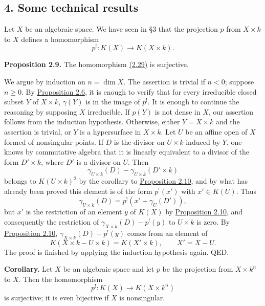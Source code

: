 \subsection*{4. Some technical results}

Let $X$ be an algebraic space. We have seen in \S 3 that the projection $p$ from $X\times k$ to $X$ defines a homomorphism
\begin{equation}\tag{2.29}
 p^!:K(X)\longrightarrow K(X\times k).
\end{equation}

\textbf{Proposition 2.9.} The homomorphism \hyperlink{sga6.e00.eq.2-29}{(2.29)} is surjective.

We argue by induction on $n=\dim X$. The assertion is trivial if $n<0$; suppose $n\geq 0$. By \hyperlink{sga6.e00.prop.2-6}{Proposition 2.6}, it is enough to verify that for every irreducible closed subset $Y$ of $X\times k$, $\gamma(Y)$ is in the image of $p^!$. It is enough to continue the reasoning by supposing $X$ irreducible. If $p(Y)$ is not dense in $X$, our assertion follows from the induction hypothesis. Otherwise, either $Y=X\times k$ and the assertion is trivial, or $Y$ is a hypersurface in $X\times k$. Let $U$ be an affine open of $X$ formed of nonsingular points. If $D$ is the divisor on $U\times k$ induced by $Y$, one knows by commutative algebra that it is linearly equivalent to a divisor of the form $D'\times k$, where $D'$ is a divisor on $U$. Then
\[
 \gamma_{U\times k}(D)-\gamma_{U\times k}(D'\times k)
\]
belongs to $K(U\times k)^2$ by the corollary to \hyperlink{sga6.e00.prop.2-10}{Proposition 2.10}, and by what has already been proved this element is of the form $p^!(x')$ with $x'\in K(U)$. Thus
\[
 \gamma_{U\times k}(D)=p^!(x'+\gamma_U(D')),
\]
but $x'$ is the restriction of an element $y$ of $K(X)$ by \hyperlink{sga6.e00.prop.2-10}{Proposition 2.10}, and consequently the restriction of $\gamma_{X\times k}(D)-p^!(y)$ to $U\times k$ is zero. By \hyperlink{sga6.e00.prop.2-10}{Proposition 2.10}, $\gamma_{X\times k}(D)-p^!(y)$ comes from an element of
\[
 K(X\times k-U\times k)=K(X'\times k),\qquad X'=X-U.
\]
The proof is finished by applying the induction hypothesis again. QED.

\textbf{Corollary.} Let $X$ be an algebraic space and let $p$ be the projection from $X\times k^n$ to $X$. Then the homomorphism
\[
 p^!:K(X)\longrightarrow K(X\times k^n)
\]
is surjective; it is even bijective if $X$ is nonsingular.


